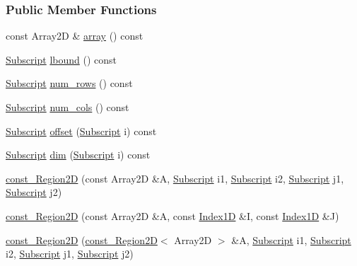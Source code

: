 \subsubsection*{Public Member Functions}
\begin{DoxyCompactItemize}
\item 
const Array2D \& \hyperlink{class_t_n_t_1_1const___region2_d_ad65d2a8e15414d419b5d67409cfaaf50}{array} () const 
\item 
\hyperlink{namespace_t_n_t_af22e3f1460e145c04ce4e7d701e4c1c1}{Subscript} \hyperlink{class_t_n_t_1_1const___region2_d_aad9e2440cca7505632e5fe2d7bb234f9}{lbound} () const 
\item 
\hyperlink{namespace_t_n_t_af22e3f1460e145c04ce4e7d701e4c1c1}{Subscript} \hyperlink{class_t_n_t_1_1const___region2_d_ad739c0dcc191e08f0a4201de2a96e17d}{num\_\-rows} () const 
\item 
\hyperlink{namespace_t_n_t_af22e3f1460e145c04ce4e7d701e4c1c1}{Subscript} \hyperlink{class_t_n_t_1_1const___region2_d_a5bee4e0ec29f65eb5edf9179952e19ca}{num\_\-cols} () const 
\item 
\hyperlink{namespace_t_n_t_af22e3f1460e145c04ce4e7d701e4c1c1}{Subscript} \hyperlink{class_t_n_t_1_1const___region2_d_a0d907f80a2cdf57267b9a17a2f4dc011}{offset} (\hyperlink{namespace_t_n_t_af22e3f1460e145c04ce4e7d701e4c1c1}{Subscript} i) const 
\item 
\hyperlink{namespace_t_n_t_af22e3f1460e145c04ce4e7d701e4c1c1}{Subscript} \hyperlink{class_t_n_t_1_1const___region2_d_afdfe7b3cb4e6d40ed6898a896da653e3}{dim} (\hyperlink{namespace_t_n_t_af22e3f1460e145c04ce4e7d701e4c1c1}{Subscript} i) const 
\item 
\hyperlink{class_t_n_t_1_1const___region2_d_a0b756345bdf042b6be5ca5c742779621}{const\_\-Region2D} (const Array2D \&A, \hyperlink{namespace_t_n_t_af22e3f1460e145c04ce4e7d701e4c1c1}{Subscript} i1, \hyperlink{namespace_t_n_t_af22e3f1460e145c04ce4e7d701e4c1c1}{Subscript} i2, \hyperlink{namespace_t_n_t_af22e3f1460e145c04ce4e7d701e4c1c1}{Subscript} j1, \hyperlink{namespace_t_n_t_af22e3f1460e145c04ce4e7d701e4c1c1}{Subscript} j2)
\item 
\hyperlink{class_t_n_t_1_1const___region2_d_ac4783f1506db1facc625bcbc24a262a0}{const\_\-Region2D} (const Array2D \&A, const \hyperlink{class_t_n_t_1_1_index1_d}{Index1D} \&I, const \hyperlink{class_t_n_t_1_1_index1_d}{Index1D} \&J)
\item 
\hyperlink{class_t_n_t_1_1const___region2_d_a0f9dbd8c03d5a54fd931c2d306255aed}{const\_\-Region2D} (\hyperlink{class_t_n_t_1_1const___region2_d}{const\_\-Region2D}$<$ Array2D $>$ \&A, \hyperlink{namespace_t_n_t_af22e3f1460e145c04ce4e7d701e4c1c1}{Subscript} i1, \hyperlink{namespace_t_n_t_af22e3f1460e145c04ce4e7d701e4c1c1}{Subscript} i2, \hyperlink{namespace_t_n_t_af22e3f1460e145c04ce4e7d701e4c1c1}{Subscript} j1, \hyperlink{namespace_t_n_t_af22e3f1460e145c04ce4e7d701e4c1c1}{Subscript} j2)

\end{DoxyCompactItemize}
